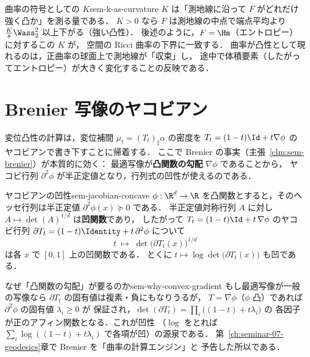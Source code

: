 \begin{remark}{曲率の符号としての $K$}{sem-k-as-curvature}
  $K$ は「測地線に沿って $F$ がどれだけ強く凸か」を測る量である．
  $K>0$ なら $F$ は測地線の中点で端点平均より
  $\tfrac{K}{8}\Wass_2^2$ 以上下がる（強い凸性）．
  後述のように，$F=\Hm$（エントロピー）に対するこの $K$ が，
  空間の Ricci 曲率の下界に一致する．
  曲率が凸性として現れるのは，正曲率の球面上で測地線が「収束」し，
  途中で体積要素（したがってエントロピー）が大きく変化することの反映である．
\end{remark}

\section{Brenier 写像のヤコビアン}
\label{sec:sem-brenier-jacobian}

変位凸性の計算は，変位補間 $\mu_t=(T_t)_\sharp\alpha$ の密度を
$T_t=(1-t)\Id+t\nabla\phi$ のヤコビアンで書き下すことに帰着する．
ここで Brenier の事実（主張~\ref{clm:sem-brenier}）が本質的に効く：
最適写像が\textbf{凸関数の勾配} $\nabla\phi$ であることから，
ヤコビ行列 $\partial^2\phi$ が半正定値となり，行列式の凹性が使えるのである．

\begin{claim}{ヤコビアンの凹性}{sem-jacobian-concave}
  $\phi:\R^d\to\R$ を凸関数とすると，そのヘッセ行列は半正定値
  $\partial^2\phi(x)\succeq0$ である．
  半正定値対称行列 $A$ に対し $A\mapsto\det(A)^{1/d}$ は\textbf{凹関数}であり，
  したがって $T_t=(1-t)\Id+t\,\nabla\phi$ のヤコビ行列
  $\partial T_t=(1-t)\Identity+t\,\partial^2\phi$ について
  \[
    t\;\longmapsto\;\det\bigl(\partial T_t(x)\bigr)^{1/d}
  \]
  は各 $x$ で $[0,1]$ 上の凹関数である．
  とくに $t\mapsto\log\det\bigl(\partial T_t(x)\bigr)$ も凹である．
\end{claim}

\begin{remark}{なぜ「凸関数の勾配」が要るのか}{sem-why-convex-gradient}
  もし最適写像が一般の写像なら $\partial T_t$ の固有値は複素・負にもなりうるが，
  $T=\nabla\phi$（$\phi$ 凸）であれば $\partial^2\phi$ の固有値 $\lambda_i\ge0$ が
  保証され，$\det(\partial T_t)=\prod_i\bigl((1-t)+t\lambda_i\bigr)$ の
  各因子が正のアフィン関数となる．これが凹性
  （$\log$ をとれば $\sum_i\log((1-t)+t\lambda_i)$ で各項が凹）の源泉である．
  第~\ref{ch:seminar-07-geodesics}章で Brenier を「曲率の計算エンジン」と
  予告した所以である．
\end{remark}

